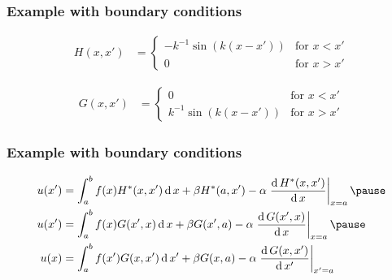 \documentclass[12 pt, compress, handout, intlimits]{beamer}
\renewcommand{\d}{\operatorname{d}}
\begin{document}
\begin{frame}[fragile]
    \frametitle{Example with boundary conditions}
     
    \begin{align*}
        H(x,x') &= 
            \begin{cases} 
                - k^{-1} \sin(k (x - x')) & \text{for } x < x'
                \\
                0 & \text{for } x > x'
            \end{cases} 
    \end{align*}

    \begin{align*}
        G(x,x') &= 
            \begin{cases} 
                0 & \text{for } x < x'
                \\
                k^{-1} \sin(k (x - x')) & \text{for } x > x'
            \end{cases} 
    \end{align*}

\end{frame}


\begin{frame}[fragile]
    \frametitle{Example with boundary conditions}
 
    \begin{align*}
        u(x') &= \int_a^b f(x) H^*(x,x') \d x + \beta H^*(a,x') - \alpha \left. \frac{\d H^*(x,x')}{\d x} \right|_{x=a}
        \pause
        \\
        u(x') &= \int_a^b f(x) G(x',x) \d x + \beta G(x',a) - \alpha \left. \frac{\d G(x',x)}{\d x} \right|_{x=a}
        \pause
        \\
        u(x) &= \int_a^b f(x') G(x,x') \d x' + \beta G(x,a) - \alpha \left.\frac{\d G(x,x')}{\d x'}\right|_{x'=a}
    \end{align*}
    
\end{frame}

\end{document}
